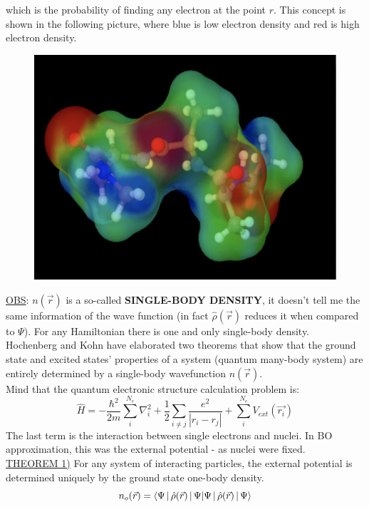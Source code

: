 which is the probability of finding any electron at the point $r$. 
This concept is shown in the following picture,  where blue is low electron density and red is high electron density.\\
\begin{figure}[htbp!]
	\centering
	\includegraphics[scale=0.30]{img_14}
\end{figure}
\newline
\ul{OBS}: $n(\vec{r})$ is a so-called \textbf{SINGLE-BODY DENSITY}, it doesn't tell me the same information of the wave function (in fact $\hat{\rho}(\vec{r})$ reduces it when compared to $\Psi$). 
For any Hamiltonian there is one and only single-body density.\\

Hochenberg and Kohn have elaborated two theorems that show that the ground state and excited states' properties of a system (quantum many-body system) are entirely determined by a single-body wavefunction $n(\vec{r})$.\\
Mind that the quantum electronic structure calculation problem is:
\[
\hat{H}=-\frac{\hbar^2}{2m}\sum_i^{N_e}\nabla_i^2+\frac{1}{2}\sum_{i\neq j} \frac{e^2}{|r_i-r_j|}+\sum_i^{N_e}V_{ext}(\vec{r_i})
\]
The last term is the interaction between single electrons and nuclei. 
In BO approximation, this was the external potential - as nuclei were fixed.\\

\ul{THEOREM 1)} For any system of interacting particles, the external potential is determined uniquely by the ground state one-body density.
\[n_o(\vec{r})=\braket{\Psi\,|\,\hat{\rho}(\vec{r})\,|\,\Psi}\]

